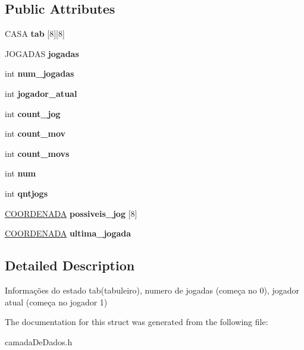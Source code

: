 \subsection*{Public Attributes}
\begin{DoxyCompactItemize}
\item 
\mbox{\label{structESTADO_ab56f0f1be16954d3768b4174d14c087d}} 
C\+A\+SA {\bfseries tab} \mbox{[}8\mbox{]}\mbox{[}8\mbox{]}
\item 
\mbox{\label{structESTADO_afae43b87a488fad0f2b56a18bad31d18}} 
J\+O\+G\+A\+D\+AS {\bfseries jogadas}
\item 
\mbox{\label{structESTADO_a261495728744647e618b4e623f5a4b7a}} 
int {\bfseries num\+\_\+jogadas}
\item 
\mbox{\label{structESTADO_a5dd28e2e68b7aef2b6b7ea88e02eff58}} 
int {\bfseries jogador\+\_\+atual}
\item 
\mbox{\label{structESTADO_a5632721fdfcc6c98f084c91aef5b6e25}} 
int {\bfseries count\+\_\+jog}
\item 
\mbox{\label{structESTADO_a36e8d21ac156e82ce914ccdafc6796ea}} 
int {\bfseries count\+\_\+mov}
\item 
\mbox{\label{structESTADO_a49b04d6940f820509146c9162ac10542}} 
int {\bfseries count\+\_\+movs}
\item 
\mbox{\label{structESTADO_a248a8554633b7e8e40142e5b8c4e6960}} 
int {\bfseries num}
\item 
\mbox{\label{structESTADO_ae0aaae1dc17799598305cd40a3ca2ba8}} 
int {\bfseries qntjogs}
\item 
\mbox{\label{structESTADO_ab9b11998a54bde459f72cbbc32e79b0b}} 
\hyperlink{structCOORDENADA}{C\+O\+O\+R\+D\+E\+N\+A\+DA} {\bfseries possiveis\+\_\+jog} \mbox{[}8\mbox{]}
\item 
\mbox{\label{structESTADO_a4896a5c5c1f40b43fb795623327e3f47}} 
\hyperlink{structCOORDENADA}{C\+O\+O\+R\+D\+E\+N\+A\+DA} {\bfseries ultima\+\_\+jogada}
\end{DoxyCompactItemize}


\subsection{Detailed Description}
Informações do estado tab(tabuleiro), numero de jogadas (começa no 0), jogador atual (começa no jogador 1) 

The documentation for this struct was generated from the following file\+:\begin{DoxyCompactItemize}
\item 
camada\+De\+Dados.\+h\end{DoxyCompactItemize}
